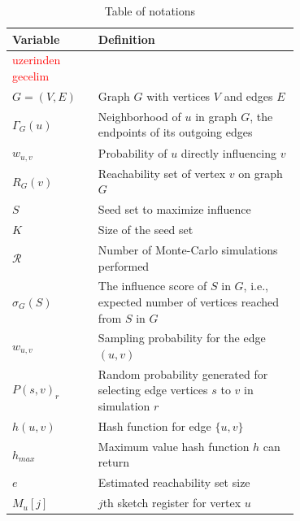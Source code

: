 \documentclass[10pt,journal,compsoc]{IEEEtran}
\newcommand\kktodo[1]{\textcolor{red}{#1}}
\begin{document}
\begin{table}[!ht]
    \caption{Table of notations}
    \label{tab:notation}
    \centering
    \begin{tabular}{|l|p{0.7\linewidth}|}
        \hline
        Variable & Definition  \\
        \hline
        \kktodo{uzerinden 
        gecelim}\\
        $G = (V,E)$     & Graph $G$ with vertices $V$ and edges $E$ \\
        $\Gamma_G(u)$   & Neighborhood of $u$ in graph $G$, the endpoints of its outgoing edges\\ %
        $w_{u,v}$       & Probability of $u$ directly influencing $v$ \\
        $R_{G}(v)$      & Reachability set of vertex $v$ on graph $G$\\
        \hline\hline
        $S$             & Seed set to maximize influence\\
        $K$             & Size of the seed set\\
        $\mathcal{R}$   & Number of Monte-Carlo simulations performed\\
        $\sigma_{G}(S)$ & The influence score of $S$ in $G$, i.e., expected number of vertices reached from $S$ in $G$\\
        \hline\hline
        $w_{u,v}$             & Sampling probability for the edge $(u,v)$\\
        $P(s,v)_r $     & Random probability generated for selecting edge vertices $s$ to $v$ in simulation $r$\\
        $h(u,v)$        & Hash function for edge $\{u,v\}$\\
        $h_{max}$       & Maximum value hash function $h$ can return\\
        \hline\hline
        $e$             & Estimated reachability set size\\
        $M_u[j]$        & $j$th sketch register for vertex $u$\\

\end{tabular}
\end{table}
\end{document}
